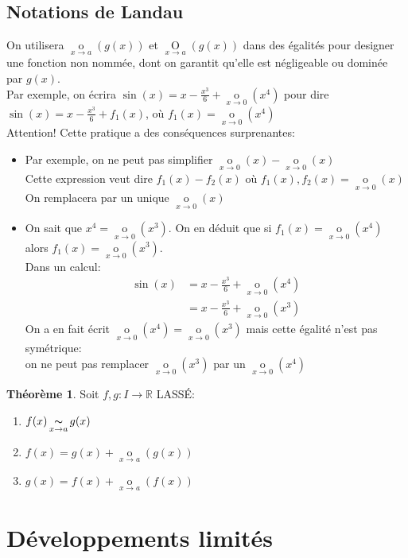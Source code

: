 \documentclass[10pt,a4paper]{article}
\theoremstyle{definition}
\newtheorem{theorem}[proposition]{Théorème}
\DeclareMathOperator*{\eqv}{\thicksim}
\DeclareMathOperator*{\negl}{o}
\DeclareMathOperator*{\dom}{O}
\begin{document}
\pagebreak

\subsection{Notations de Landau}
On utilisera $\negl\limits_{x \to a}(g(x))$ et $\dom\limits_{x \to a}(g(x))$ dans des égalités pour designer une fonction non nommée, dont on garantit qu'elle est négligeable ou dominée par $g(x)$. \\
Par exemple, on écrira $\sin(x) = x - \frac{x^3}{6} + \negl\limits_{x \to 0}(x^4)$ pour dire $\sin(x) = x - \frac{x^3}{6} + f_1(x)$, où $f_1(x) = \negl\limits_{x \to 0}(x^4)$ \\
Attention! Cette pratique a des conséquences surprenantes:
\begin{itemize}
\item Par exemple, on ne peut pas simplifier $\negl\limits_{x \to 0}(x) - \negl\limits_{x \to 0}(x)$ \\
Cette expression veut dire $f_1(x) - f_2(x)$ où $f_1(x), f_2(x) = \negl\limits_{x \to 0}(x)$ \\
On remplacera par un unique $\negl\limits_{x \to 0}(x)$
\item On sait que $x^4 = \negl\limits_{x \to 0}(x^3)$. On en déduit que si $f_1(x) = \negl\limits_{x \to 0}(x^4)$ alors $f_1(x) = \negl\limits_{x \to 0}(x^3)$. \\
Dans un calcul:
\begin{align*}
\sin(x) &= x - \frac{x^3}{6} + \negl\limits_{x \to 0}(x^4) \\
        &= x - \frac{x^3}{6} + \negl\limits_{x \to 0}(x^3)
\end{align*}
On a en fait écrit $\negl\limits_{x \to 0}(x^4) = \negl\limits_{x \to 0}(x^3)$ mais cette égalité n'est pas symétrique: \\
on ne peut pas remplacer $\negl\limits_{x \to 0}(x^3)$ par un $\negl\limits_{x \to 0}(x^4)$
\end{itemize}
\begin{theorem}
Soit $f,g: I \to \mathbb{R}$ LASSÉ:
\begin{enumerate}
\item $f(x) \eqv\limits_{x \to a} g(x)$
\item $f(x) = g(x) + \negl\limits_{x \to a}(g(x))$
\item $g(x) = f(x) + \negl\limits_{x \to a}(f(x))$
\end{enumerate}
\end{theorem}

\section{Développements limités}
\end{document}
